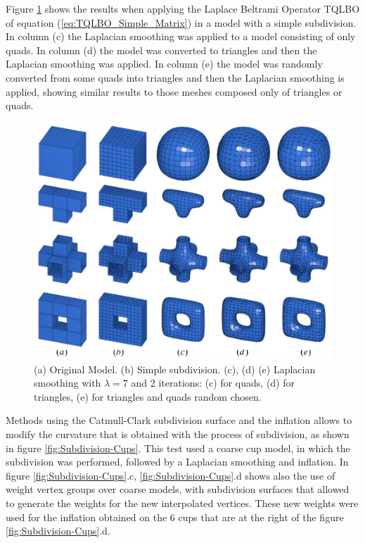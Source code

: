 \documentclass[10pt, conference]{IEEEtran}
\begin{document}
Figure \ref{fig:TQLBO_test} shows the results when applying the Laplace
Beltrami Operator TQLBO of equation (\ref{eq:TQLBO_Simple_Matrix})
in a model with a simple subdivision. In column (c) the Laplacian
smoothing was applied to a model consisting of only quads. In column
(d) the model was converted to triangles and then the Laplacian smoothing
was applied. In column (e) the model was randomly converted from some
quads into triangles and then the Laplacian smoothing is applied,
showing similar results to those meshes composed only of triangles
or quads.

\begin{figure}
\includegraphics[width=1\columnwidth]{figs/test_triangles_quads}

\caption{\label{fig:TQLBO_test}(a) Original Model. (b) Simple subdivision.
(c), (d) (e) Laplacian smoothing with $\lambda=7$ and 2 iterations:
(c) for quads, (d) for triangles, (e) for triangles and quads random
chosen.}
\end{figure}


Methods using the Catmull-Clark subdivision surface and the inflation
allows to modify the curvature that is obtained with the process of
subdivision, as shown in figure \eqref{fig:Subdivision-Cups}. This
test used a coarse cup model, in which the subdivision was performed,
followed by a Laplacian smoothing and inflation. In figure \eqref{fig:Subdivision-Cups}.c,
\eqref{fig:Subdivision-Cups}.d shows also the use of weight vertex
groups over coarse models, with subdivision surfaces that allowed
to generate the weights for the new interpolated vertices. These new
weights were used for the inflation obtained on the 6 cups that
are at the right of the figure \eqref{fig:Subdivision-Cups}.d.
\end{document}
